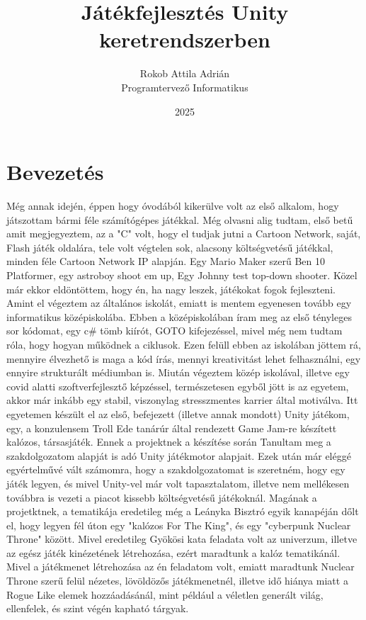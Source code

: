 \documentclass[
]{thesis-ekf}
\theoremstyle{definition}
\theoremstyle{remark}
\begin{document}
	
	\title{Játékfejlesztés Unity keretrendszerben}
	\author{Rokob Attila Adrián\\Programtervező Informatikus}
	\date{2025}
	\maketitle
	
	\tableofcontents
	\chapter*{Bevezetés}
	
	Még annak idején, éppen hogy óvodából kikerülve volt az első alkalom, hogy játszottam bármi féle számítógépes játékkal. Még olvasni alig tudtam, első betű amit megjegyeztem, az a "C" volt, hogy el tudjak jutni a Cartoon Network, saját, Flash játék oldalára, tele volt végtelen sok, alacsony költségvetésű játékkal, minden féle Cartoon Network IP alapján. Egy Mario Maker szerű Ben 10 Platformer, egy astroboy shoot em up, Egy Johnny test top-down shooter.
	Közel már ekkor eldöntöttem, hogy én, ha nagy leszek, játékokat fogok fejleszteni. Amint el végeztem az általános iskolát, emiatt is mentem egyenesen tovább egy informatikus középiskolába. Ebben a középiskolában íram meg az első tényleges sor kódomat, egy c\# tömb kiírót, GOTO kifejezéssel, mivel még nem tudtam róla, hogy hogyan működnek a ciklusok. Ezen felüll ebben az iskolában jöttem rá, mennyire élvezhető is maga a kód írás, mennyi kreativitást lehet felhasználni, egy ennyire strukturált médiumban is.
	Miután végeztem közép iskolával, illetve egy covid alatti szoftverfejlesztő képzéssel, természetesen egyből jött is az egyetem, akkor már inkább egy stabil, viszonylag stresszmentes karrier által motiválva.
	Itt egyetemen készült el az első, befejezett (illetve annak mondott) Unity játékom, egy, a konzulensem Troll Ede tanárúr által rendezett Game Jam-re készített kalózos, társasjáték.
	Ennek a projektnek a készítése során Tanultam meg a szakdolgozatom alapját is adó Unity játékmotor alapjait. Ezek után már eléggé egyértelművé vált számomra, hogy a szakdolgozatomat is szeretném, hogy egy játék legyen, és mivel Unity-vel már volt tapasztalatom, illetve nem mellékesen továbbra is vezeti a piacot kissebb költségvetésű játékoknál.
	Magának a projetktnek, a tematikája eredetileg még a Leányka Bisztró egyik kanapéján dőlt el, hogy legyen fél úton egy "kalózos For The King", és egy "cyberpunk Nuclear Throne" között. Mivel eredetileg Gyökösi kata feladata volt az univerzum, illetve az egész játék kinézetének létrehozása, ezért maradtunk a kalóz tematikánál. Mivel a játékmenet létrehozása az én feladatom volt, emiatt maradtunk Nuclear Throne szerű felül nézetes, lövöldözős játékmenetnél, illetve idő hiánya miatt a Rogue Like elemek hozzáadásánál, mint például a véletlen generált világ, ellenfelek, és szint végén kapható tárgyak.
	
\end{document}
